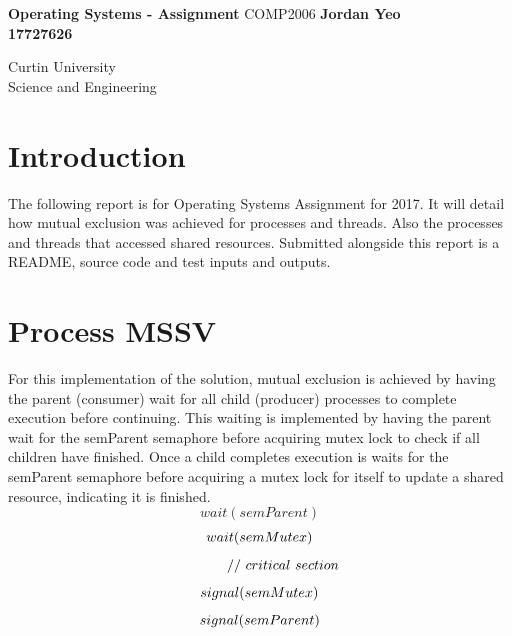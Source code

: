 \documentclass[]{article}
\begin{document}

\begin{titlepage}
	\begin{center}
		\vspace*{1cm}
		\LARGE\textbf{Operating Systems - Assignment}
		\break
		COMP2006
		\vspace{1cm}
		\break
		\Large\textbf{Jordan Yeo \\17727626} 
		\vspace{3cm}

		
		\vspace{14.0cm}
		\normalsize
		Curtin University \\
		Science and Engineering \\
		
	\end{center}
\end{titlepage}

\tableofcontents
\pagebreak


\section*{Introduction}
The following report is for Operating Systems Assignment for 2017. It will detail how mutual exclusion was achieved for processes and threads. Also the processes and threads that accessed shared resources. Submitted alongside this report is a README, source code and test inputs and outputs.

\section{Process MSSV}
For this implementation of the solution, mutual exclusion is achieved by having the parent (consumer) wait for all child (producer) processes to complete execution before continuing. This waiting is implemented by having the parent wait for the semParent semaphore before acquiring mutex lock to check if all children have finished. Once a child completes execution is waits for the semParent semaphore before acquiring a mutex lock for itself to update a shared resource, indicating it is finished. 
$$
wait(semParent)
$$
$$
wait(semMutex)\\
$$
$$
\ \ \ \ \ \ \ \ \ \ //\ critical\ section\\ 
$$
$$
signal(semMutex) \\
$$
$$
signal(semParent)\\ \\
$$
\vspace{0.1cm}
\end{document}
